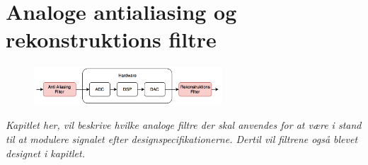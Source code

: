 \chapter{Analoge antialiasing og rekonstruktions filtre}\label{kap:analog_filter}

\begin{figure}[h]
	\vspace*{-1 cm}
	\includegraphics[width=7cm]{billeder/flow_filter}
	\vspace{0.5 cm}
\end{figure}

\emph{Kapitlet her, vil beskrive hvilke analoge filtre der skal anvendes for at være i stand til at modulere signalet efter designspecifikationerne. Dertil vil filtrene også blevet designet i kapitlet.}
